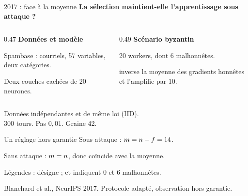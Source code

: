 
\begin{frame}{2017 : \mkrum{} face à la moyenne}
    \textbf{La sélection maintient-elle l'apprentissage sous attaque ?}
    \medskip
    \begin{columns}[T,onlytextwidth]
        \begin{column}{0.47\textwidth}
            \textbf{Données et modèle}
            \par Spambase : courriels, 57 variables, deux catégories.
            \par Deux couches cachées de 20 neurones.
        \end{column}
        \begin{column}{0.49\textwidth}
            \textbf{Scénario byzantin}
            \par 20 workers, dont 6 malhonnêtes.
            \par \signflip{} inverse la moyenne des gradients honnêtes et l'amplifie par 10.
        \end{column}
    \end{columns}
    \medskip
    Données indépendantes et de même loi (IID).\\
    300 tours. Pas $0{,}01$. Graine 42.
    \begin{block}{Un réglage hors garantie}
        Sous attaque : $m=n-f=14$.
        \par Sans attaque : $m=n$, donc \mkrum{} coïncide avec la moyenne.
    \end{block}
    {\small Légendes :  désigne \average{} ;  et  indiquent 0 et 6 malhonnêtes.\par}
    {\footnotesize Blanchard et al., NeurIPS 2017. Protocole adapté, observation hors garantie.\par}
\end{frame}

